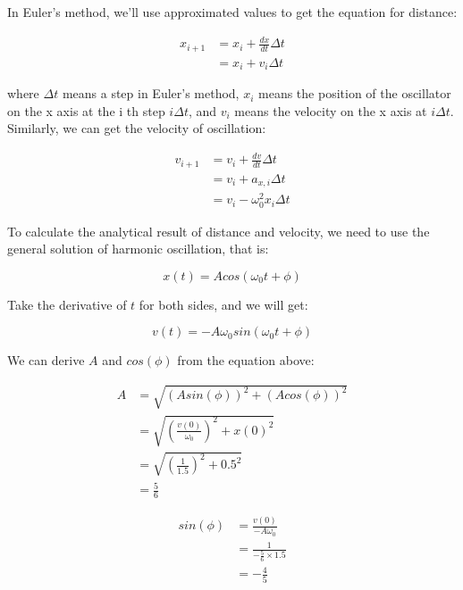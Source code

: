 \documentclass[12pt]{article}
\begin{document}
In Euler's method, we'll use approximated values to  get the equation for distance: 

\begin{align}
    x_{i+1} &= x_{i} + \frac{dx}{dt} \Delta t \\
            &= x_{i} + v_{i} \Delta t \nonumber 
\end{align}

where $\Delta t$ means a step in Euler's method, $x_{i}$ means the position of the oscillator on the x axis at the i th step $i \Delta t$, and $v_{i}$ means the velocity on the x axis at $i \Delta t$. \\

Similarly, we can get the velocity of oscillation: 

\begin{align}
    v_{i+1} &= v_{i} + \frac{dv}{dt} \Delta t \\
            &= v_{i} + a_{x,i} \Delta t \nonumber \\
            &= v_{i} - \omega_{0}^2 x_{i} \Delta t \nonumber 
\end{align}

To calculate the analytical result of distance and velocity, we need to use the general solution of harmonic oscillation, that is: 

\begin{equation}
    x(t) = A cos( \omega_{0} t + \phi )
\end{equation}

Take the derivative of $t$ for both sides, and we will get: 

\begin{equation}
    v(t) = -A \omega_{0} sin( \omega_{0} t + \phi )
\end{equation}

We can derive $A$ and $cos(\phi)$ from the equation above: 

\begin{align}
    A &= \sqrt{(A sin(\phi))^2 + (A cos(\phi))^2} \\
      &= \sqrt{\left( \frac{v(0)}{\omega_{0}} \right)^2 + x(0)^2} \nonumber \\
      &= \sqrt{\left( \frac{1}{1.5} \right)^2 + 0.5^2} \nonumber \\
      &= \frac{5}{6} \nonumber 
\end{align}

\begin{align}
    sin(\phi) &= \frac{v(0)}{-A \omega_{0}} \\
              &= \frac{1}{-\frac{5}{6} \times 1.5} \nonumber \\
              &= -\frac{4}{5} \nonumber
\end{align}
\end{document}
